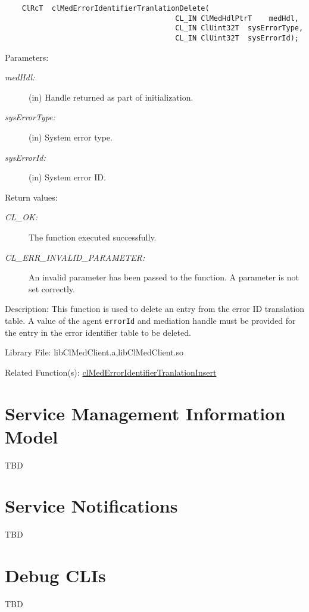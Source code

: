 \begin{flushleft}
\begin{Desc}
\footnotesize\begin{verbatim}    ClRcT  clMedErrorIdentifierTranlationDelete(
                                  		CL_IN ClMedHdlPtrT    medHdl,
                                  		CL_IN ClUint32T  sysErrorType,
                                  		CL_IN ClUint32T  sysErrorId);
\end{verbatim}
\normalsize
\end{Desc}
\begin{Desc}
\item[Parameters:]
\begin{description}
\item[{\em med\-Hdl:}](in) Handle returned as part of initialization. 
\item[{\em sys\-Error\-Type:}](in) System error type. 
\item[{\em sys\-Error\-Id:}](in) System error ID.\end{description}
\end{Desc}
\begin{Desc}
\item[Return values:]
\begin{description}
\item[{\em CL\_\-OK:}]The function executed successfully. 
\item[{\em CL\_\-ERR\_\-INVALID\_\-PARAMETER:}]An invalid parameter has been passed to the function. A parameter is not set correctly.\end{description}
\end{Desc}
\begin{Desc}
\item[Description:]This function is used to delete an entry from the error ID translation table. A value of the agent {\tt{error\-Id}} and 
mediation handle must be provided for the entry in the error identifier table to be deleted.\end{Desc}
\begin{Desc}
\item[Library File:]lib\-Cl\-Med\-Client.a,lib\-Cl\-Med\-Client.so\end{Desc}
\begin{Desc}
\item[Related Function(s):]\hyperlink{pagemed108}{cl\-Med\-Error\-Identifier\-Tranlation\-Insert} \end{Desc}
\chapter{Service Management Information Model}
TBD

\chapter{Service Notifications}
TBD

\chapter{Debug CLIs}
TBD




\end{flushleft}